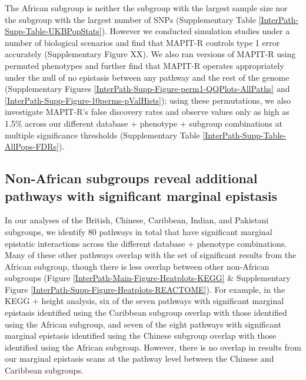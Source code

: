 \documentclass[12pt,a4paper]{article}
\begin{document}
The African subgroup is neither the subgroup with the largest sample size nor the subgroup with the largest number of SNPs (Supplementary Table \ref{InterPath-Supp-Table-UKBPopStats}). However we conducted simulation studies under a number of biological scenarios and find that MAPIT-R controls type 1 error accurately (Supplementary Figure XX). We also ran versions of MAPIT-R using permuted phenotypes and further find that MAPIT-R operates appropriately under the null of no epistasis between any pathway and the rest of the genome (Supplementary Figures \ref{InterPath-Supp-Figure-perm1-QQPlots-AllPaths} and \ref{InterPath-Supp-Figure-10perms-pValHists}); using these permutations, we also investigate MAPIT-R's false discovery rates and observe values only as high as 1.5\% across our different database + phenotype + subgroup combinations at multiple significance thresholds (Supplementary Table \ref{InterPath-Supp-Table-AllPops-FDRs}).

\subsection{Non-African subgroups reveal additional pathways with significant marginal epistasis}

In our analyses of the British, Chinese, Caribbean, Indian, and Pakistani subgroups, we identify 80 pathways in total that have significant marginal epistatic interactions across the different database + phenotype combinations. Many of these other pathways overlap with the set of significant results from the African subgroup, though there is less overlap between other non-African subgroups (Figure \ref{InterPath-Main-Figure-Heatplots-KEGG} \& Supplementary Figure \ref{InterPath-Supp-Figure-Heatplots-REACTOME}). For example, in the KEGG + height analysis, six of the seven pathways with significant marginal epistasis identified using the Caribbean subgroup overlap with those identified using the African subgroup, and seven of the eight pathways with significant marginal epistasis identified using the Chinese subgroup overlap with those identified using the African subgroup. However, there is no overlap in results from our marginal epistasis scans at the pathway level between the Chinese and Caribbean subgroups.
\end{document}
